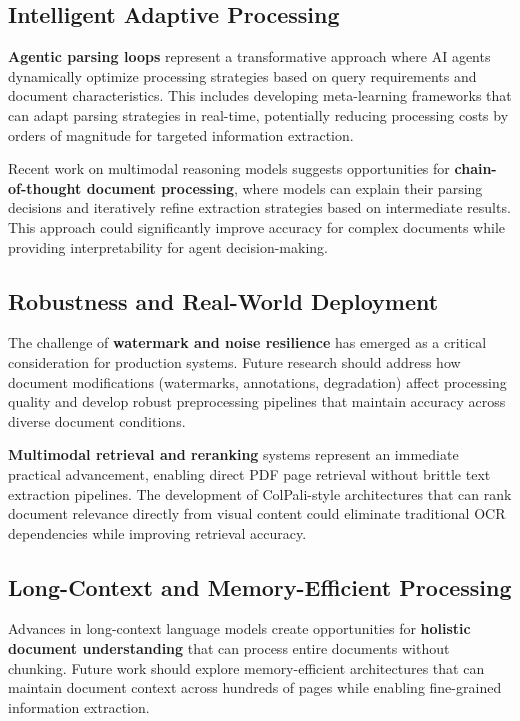 \documentclass{article}
\begin{document}
\subsection{Intelligent Adaptive Processing}

\textbf{Agentic parsing loops} represent a transformative approach where AI agents dynamically optimize processing strategies based on query requirements and document characteristics. This includes developing meta-learning frameworks that can adapt parsing strategies in real-time, potentially reducing processing costs by orders of magnitude for targeted information extraction.

Recent work on multimodal reasoning models suggests opportunities for \textbf{chain-of-thought document processing}, where models can explain their parsing decisions and iteratively refine extraction strategies based on intermediate results. This approach could significantly improve accuracy for complex documents while providing interpretability for agent decision-making.

\subsection{Robustness and Real-World Deployment}

The challenge of \textbf{watermark and noise resilience} has emerged as a critical consideration for production systems. Future research should address how document modifications (watermarks, annotations, degradation) affect processing quality and develop robust preprocessing pipelines that maintain accuracy across diverse document conditions.

\textbf{Multimodal retrieval and reranking} systems represent an immediate practical advancement, enabling direct PDF page retrieval without brittle text extraction pipelines. The development of ColPali-style architectures that can rank document relevance directly from visual content could eliminate traditional OCR dependencies while improving retrieval accuracy.

\subsection{Long-Context and Memory-Efficient Processing}

Advances in long-context language models create opportunities for \textbf{holistic document understanding} that can process entire documents without chunking. Future work should explore memory-efficient architectures that can maintain document context across hundreds of pages while enabling fine-grained information extraction.
\end{document}
